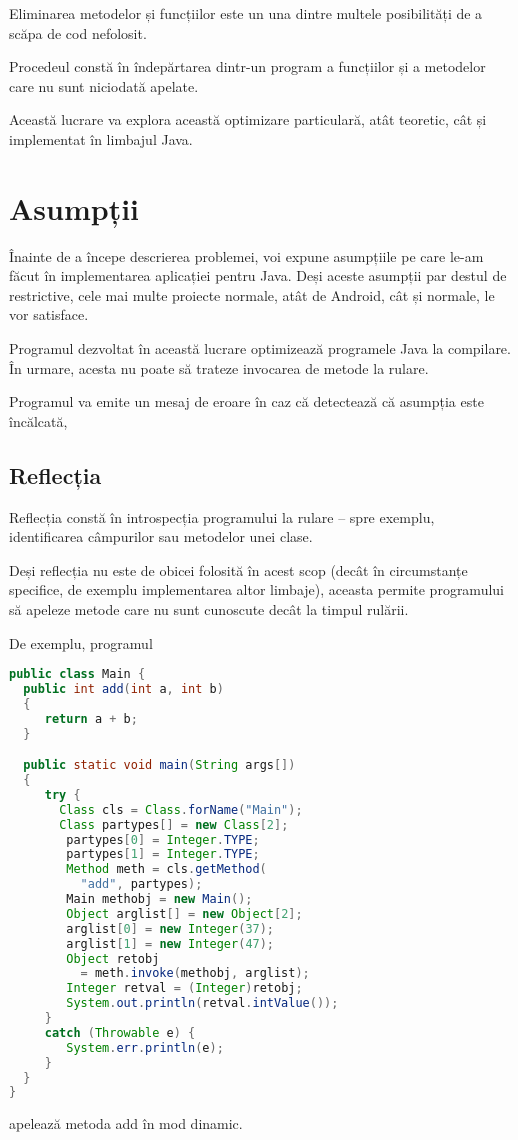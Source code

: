 Eliminarea metodelor și funcțiilor este un una dintre multele
posibilități de a scăpa de cod nefolosit.

Procedeul constă în îndepărtarea dintr-un program a funcțiilor și a
metodelor care nu sunt niciodată apelate.

Această lucrare va explora această optimizare particulară, atât
teoretic, cât și implementat în limbajul Java.



\section{Asumpții}

Înainte de a începe descrierea problemei, voi expune asumpțiile pe care le-am
făcut în implementarea aplicației pentru Java.
Deși aceste asumpții par destul de restrictive, cele mai multe proiecte normale,
atât de Android, cât și normale, le vor satisface.

Programul dezvoltat în această lucrare optimizează programele Java la compilare.
În urmare, acesta nu poate să trateze invocarea de metode la rulare.

Programul va emite un mesaj de eroare în caz că detectează că asumpția este
încălcată,

\subsection{Reflecția}

Reflecția constă în introspecția programului la rulare -- spre exemplu,
identificarea câmpurilor sau metodelor unei clase.

Deși reflecția nu este de obicei folosită în acest scop (decât în circumstanțe
specifice, de exemplu implementarea altor limbaje), aceasta permite programului
să apeleze metode care nu sunt cunoscute decât la timpul rulării.

De exemplu, programul \cite{java_reflection}
\begin{lstlisting}[language=Java]
public class Main {
  public int add(int a, int b)
  {
     return a + b;
  }

  public static void main(String args[])
  {
     try {
       Class cls = Class.forName("Main");
       Class partypes[] = new Class[2];
        partypes[0] = Integer.TYPE;
        partypes[1] = Integer.TYPE;
        Method meth = cls.getMethod(
          "add", partypes);
        Main methobj = new Main();
        Object arglist[] = new Object[2];
        arglist[0] = new Integer(37);
        arglist[1] = new Integer(47);
        Object retobj
          = meth.invoke(methobj, arglist);
        Integer retval = (Integer)retobj;
        System.out.println(retval.intValue());
     }
     catch (Throwable e) {
        System.err.println(e);
     }
  }
}
\end{lstlisting}
apelează metoda add în mod dinamic.

